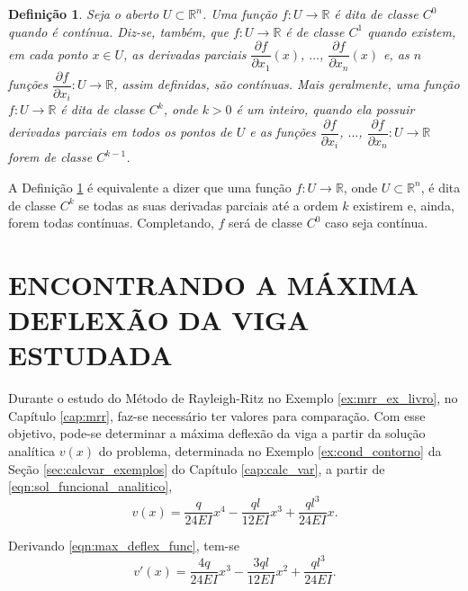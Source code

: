 \documentclass[
	12pt,				%
	openright,			%
    twoside,			%
	a4paper,			%
	english,			%
	french,				%
	spanish,			%
	brazil				%
	]{abntex2}
\newtheorem{definicao}{Definição}
\numberwithin{lema}{chapter}
\numberwithin{teorema}{chapter}
\numberwithin{definicao}{chapter}
\numberwithin{exemplo}{chapter}
\numberwithin{figure}{chapter}
\begin{document}
\begin{apendicesenv}
{	\begin{definicao}
		\label{def:cap_conceitos_analise:classe_ck}
		Seja o aberto $U\subset\mathbb{R}^n$. Uma função $f:U\longrightarrow\mathbb{R}$ é dita de classe $C^0$ quando é contínua. Diz-se, também, que $f:U\longrightarrow\mathbb{R}$ é de classe $C^1$ quando existem, em cada ponto $x\in U$, as derivadas parciais $\dfrac{\partial f}{\partial x_1}(x)$, $\dots$, $\dfrac{\partial f}{\partial x_n}(x)$ e, as $n$ funções $\dfrac{\partial f}{\partial x_i}:U\longrightarrow \mathbb{R}$, assim definidas, são contínuas. Mais geralmente, uma função $f:U\longrightarrow\mathbb{R}$ é dita de classe $C^k$, onde $k>0$ é um inteiro, quando ela possuir derivadas parciais em todos os pontos de $U$ e as funções $\dfrac{\partial f}{\partial x_i}$, $\dots$, $\dfrac{\partial f}{\partial x_n}:U\longrightarrow \mathbb{R}$ forem de classe $C^{k-1}$.
	\end{definicao}
	
	A Definição \ref{def:cap_conceitos_analise:classe_ck} é equivalente a dizer que uma função $f:U\longrightarrow\mathbb{R}$, onde $U\subset\mathbb{R}^n$, é dita de classe $C^k$ se todas as suas derivadas parciais até a ordem $k$ existirem e, ainda, forem todas contínuas. Completando, $f$ será de classe $C^0$ caso seja contínua.
}

\chapter{ENCONTRANDO A MÁXIMA DEFLEXÃO DA VIGA ESTUDADA}
\label{apend:max_deflex}
{
	Durante o estudo do Método de Rayleigh-Ritz no Exemplo \ref{ex:mrr_ex_livro}, no Capítulo \ref{cap:mrr}, faz-se necessário ter valores para comparação. Com esse objetivo, pode-se determinar a máxima deflexão da viga a partir da solução analítica $v(x)$ do problema, determinada no Exemplo \ref{ex:cond_contorno} da Seção \ref{sec:calcvar_exemplos} do Capítulo \ref{cap:calc_var}, a partir de \eqref{eqn:sol_funcional_analitico},
	\begin{equation}
	\label{eqn:max_deflex_func}
	v(x) = 
		\frac{q}{24EI} x^4
		-
		\frac{ql}{12EI} x^3
		+
		\frac{ql^3}{24EI} x
		\text{.}
	\end{equation}
	
	Derivando \eqref{eqn:max_deflex_func}, tem-se
	\begin{equation}
	\label{eqn:max_deflex_func_diff}
	v'(x) =
		\frac{4q}{24EI}x^3
		-
		\frac{3ql}{12EI}x^2
		+
		\frac{ql^3}{24EI}
		\text{.}
	\end{equation}
	
}
\end{apendicesenv}
\end{document}
